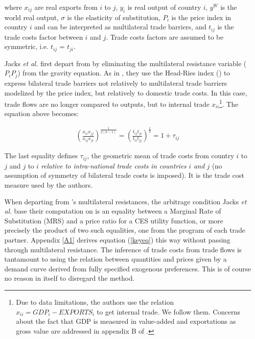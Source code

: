 \documentclass{article}
\begin{document}
where $x_{ij}$ are real exports from $i$ to $j$, $y_i$ is real
output of country $i$, $y^W$ is the world real output, $\sigma$
is the elasticity of substitution, $P_i$ is the price index in
country $i$ and can be interpreted as multilateral trade
barriers, and $t_{ij}$ is the trade costs factor between $i$
and $j$. Trade costs factors are assumed to be symmetric, i.e.
$t_{ij}$ = $t_{ji}$.

Jacks \textit{et al.} first depart from \cite{AW2003} by eliminating the
multilateral resistance variable ($P_i P_j$) from the gravity equation.
As in \cite{NOVY}, they use the Head-Ries index (\cite{HR2001}) to express bilateral trade barriers not relatively to multilateral trade barriers modelized by
the price index, but relatively to domestic trade costs. In this case,
trade flows are no longer compared to outputs, but to internal
trade $x_{ii}$\footnote{Due to data limitations, the authors
use the relation $x_{ii}=GDP_i-EXPORTS_i$ to get internal
trade. We follow them. Concerns about the fact that GDP is
measured in value-added and exportations as gross value are
addressed in appendix B of \cite{JMN2011}.}. The equation above
becomes:

\begin{eqnarray}
\left( \frac{x_{ii} x_{jj}}{x_{ij} x_{ji}}\right)^{\frac{1}{2(\sigma-1)}} =\left(\frac{t_{ij} t_{ji}}{t_{ii} t_{jj}} \right)^{\frac{1}{2}} = 1+\tau_{ij} \label{keyeq}
\end{eqnarray}

The last equality defines $\tau_{ij}$, the geometric mean of trade costs from country $i$ to $j$ and $j$ to $i$ \emph{relative to intra-national trade costs in countries $i$ and $j$} (no assumption of symmetry of bilateral trade costs is imposed). It is the trade cost measure used by the authors.

When departing from \cite{AW2003}'s multilateral resistances, the arbitrage condition Jacks \textit{et al.} base their computation on is an equality between a Marginal Rate of Substitution (MRS) and a price ratio for a CES utility function, or more precisely the product of two such equalities, one from the program of each trade partner. 
Appendix \ref{A1} derives equation (\ref{keyeq}) this way without passing through multilateral resistance.
The inference of trade costs from trade flows is tantamount to using the relation between quantities and prices given by a demand curve derived from fully specified exogenous preferences. This is of course no reason in itself to disregard the method.
\end{document}
